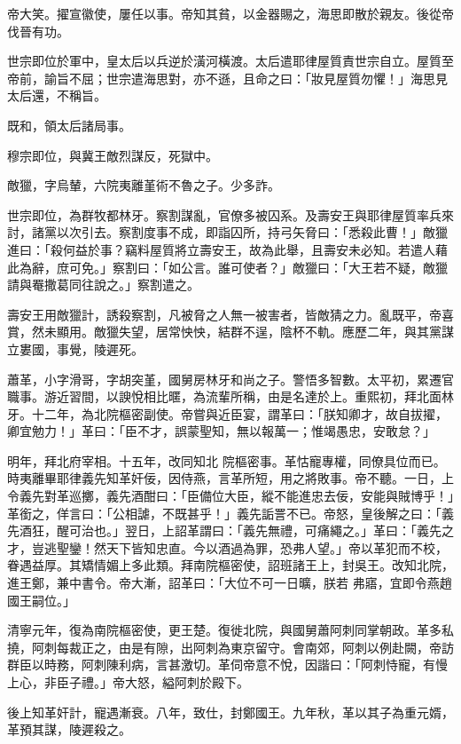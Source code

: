 \begin{pinyinscope}
 帝大笑。擢宣徽使，屢任以事。帝知其貧，以金器賜之，海思即散於親友。後從帝伐晉有功。



 世宗即位於軍中，皇太后以兵逆於潢河橫渡。太后遣耶律屋質責世宗自立。屋質至
 帝前，諭旨不屈；世宗遣海思對，亦不遜，且命之曰：「妝見屋質勿懼！」海思見太后還，不稱旨。



 既和，領太后諸局事。



 穆宗即位，與冀王敵烈謀反，死獄中。



 敵獵，字烏輦，六院夷離堇術不魯之子。少多詐。



 世宗即位，為群牧都林牙。察割謀亂，官僚多被囚系。及壽安王與耶律屋質率兵來討，諸黨以次引去。察割度事不成，即詣囚所，持弓矢脅曰：「悉殺此曹！」敵獵進曰：「殺何益於事？竊料屋質將立壽安王，故為此舉，且壽安未必知。若遣人藉此為辭，庶可免。」察割曰：「如公言。誰可使者？」敵獵曰：「大王若不疑，敵獵請與罨撒葛同往說之。」察割遣之。



 壽安王用敵獵計，誘殺察割，凡被脅之人無一被害者，皆敵猜之力。亂既平，帝喜賞，然未顯用。敵獵失望，居常怏怏，結群不逞，陰杯不軌。應歷二年，與其黨謀立婁國，事覺，陵遲死。



 蕭革，小字滑哥，字胡突堇，國舅房林牙和尚之子。警悟多智數。太平初，累遷官職事。游近習間，以諛悅相比暱，為流輩所稱，由是名達於上。重熙初，拜北面林牙。十二年，為北院樞密副使。帝嘗與近臣宴，謂革曰：「朕知卿才，故自拔擢，卿宜勉力！」革曰：「臣不才，誤蒙聖知，無以報萬一；惟竭愚忠，安敢怠？」



 明年，拜北府宰相。十五年，改同知北
 院樞密事。革怙寵專權，同僚具位而已。時夷離畢耶律義先知革奸佞，因侍燕，言革所短，用之將敗事。帝不聽。一日，上令義先對革巡擲，義先酒酣曰：「臣備位大臣，縱不能進忠去佞，安能與賊博乎！」革銜之，佯言曰：「公相謔，不既甚乎！」義先詬詈不已。帝怒，皇後解之曰：「義先酒狂，醒可治也。」翌日，上詔革謂曰：「義先無禮，可痛繩之。」革曰：「義先之才，豈逃聖鑾！然天下皆知忠直。今以酒過為罪，恐弗人望。」帝以革犯而不校，眷遇益厚。其矯情媚上多此類。拜南院樞密使，詔班諸王上，封吳王。改知北院，進王鄭，兼中書令。帝大漸，詔革曰：「大位不可一日曠，朕若
 弗寤，宜即令燕趙國王嗣位。」



 清寧元年，復為南院樞密使，更王楚。復徙北院，與國舅蕭阿刺同掌朝政。革多私撓，阿刺每裁正之，由是有隙，出阿刺為東京留守。會南郊，阿刺以例赴闕，帝訪群臣以時務，阿刺陳利病，言甚激切。革伺帝意不悅，因諧曰：「阿刺恃寵，有慢上心，非臣子禮。」帝大怒，縊阿刺於殿下。



 後上知革奸計，寵遇漸衰。八年，致仕，封鄭國王。九年秋，革以其子為重元婿，革預其謀，陵遲殺之。



\end{pinyinscope}